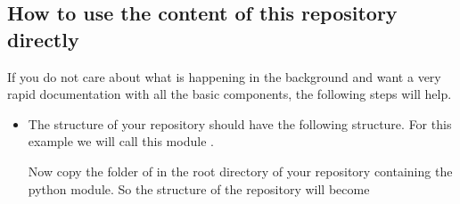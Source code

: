 \documentclass[letterpaper,10pt,english]{sphinxmanual}
\begin{document}
\subsection{How to use the content of this repository directly}
\label{\detokenize{usage:how-to-use-the-content-of-this-repository-directly}}
\sphinxAtStartPar
If you do not care about what is happening in the background and want a very rapid documentation with all the basic components, the following steps will help.
\begin{itemize}
\item {} \begin{description}
\sphinxAtStartPar
The structure of your repository should have the following structure. For this example we will call this module .
\begin{quote}

\sphinxAtStartPar
{}

\begin{sphinxVerbatim}[commandchars=\\\{\}]
 
   
   
   
  
 
 
\end{sphinxVerbatim}
\end{quote}

\sphinxAtStartPar
Now copy the  folder of  in the root directory of your repository containing the python module. So the structure of the repository will become
\begin{quote}

\sphinxAtStartPar
{}

%
\begin{sphinxVerbatim}[commandchars=\\\{\}]
 
 
   
   
   
  
 
 
\end{sphinxVerbatim}
\sphinxresetverbatimhllines
\end{quote}


\end{description}
\end{itemize}
\end{document}
